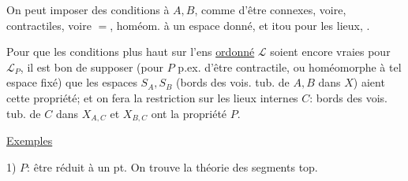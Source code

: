 
On peut imposer des conditions à $A,B$, comme d'être connexes, voire, contractiles, voire $=$, homéom. à un espace donné, et itou pour les lieux, .

Pour que les conditions plus haut sur l'ens \uline{ordonné} $\mathcal L$ soient encore vraies pour $\mathcal L_P$, il est bon de   supposer  (pour $P$  p.ex. d'être contractile, ou homéomorphe à tel espace fixé) que les espaces $S_A,S_B$ (bords des vois. tub. de $A,B$ dans $X$) aient cette propriété; et  on fera la restriction  sur les lieux internes $C$:  bords des vois. tub. de $C$ dans $X_{A,C}$ et $X_{B,C}$ ont la propriété $P$.

\uline{Exemples}

1) $P$: être  réduit à un pt. On trouve la théorie des segments top. 

